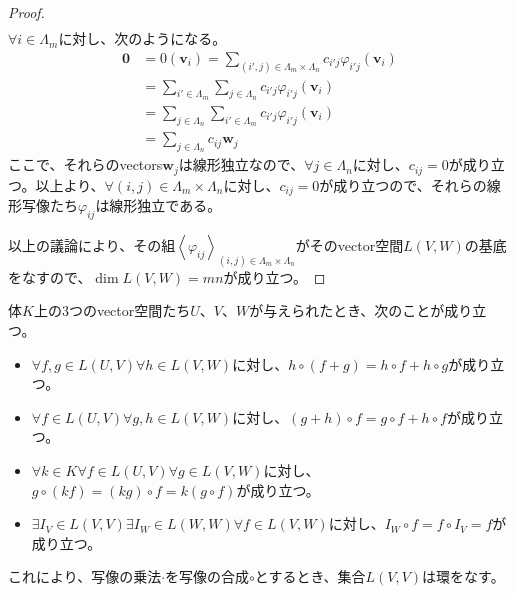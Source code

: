 \documentclass[dvipdfmx]{jsarticle}
\begin{document}
\begin{proof}
\begin{align*}
\end{align*}
$\forall i \in \varLambda_{m}$に対し、次のようになる。
\begin{align*}
\mathbf{0} &= 0\left( \mathbf{v}_{i} \right) = \sum_{\left( i',j \right) \in \varLambda_{m} \times \varLambda_{n}} {c_{i'j}\varphi_{i'j}}\left( \mathbf{v}_{i} \right)\\
&= \sum_{i' \in \varLambda_{m}} {\sum_{j \in \varLambda_{n}} {c_{i'j}\varphi_{i'j}\left( \mathbf{v}_{i} \right)}}\\
&= \sum_{j \in \varLambda_{n}} {\sum_{i' \in \varLambda_{m}} {c_{i'j}\varphi_{i'j}\left( \mathbf{v}_{i} \right)}}\\
&= \sum_{j \in \varLambda_{n}} {c_{ij}\mathbf{w}_{j}}
\end{align*}
ここで、それらのvectors$\mathbf{w}_{j}$は線形独立なので、$\forall j \in \varLambda_{n}$に対し、$c_{ij} = 0$が成り立つ。以上より、$\forall(i,j) \in \varLambda_{m} \times \varLambda_{n}$に対し、$c_{ij} = 0$が成り立つので、それらの線形写像たち$\varphi_{ij}$は線形独立である。\par
以上の議論により、その組$\left\langle \varphi_{ij} \right\rangle_{(i,j) \in \varLambda_{m} \times \varLambda_{n}}$がそのvector空間$L(V,W)$の基底をなすので、$\dim{L(V,W)} = mn$が成り立つ。
\end{proof}
\begin{thm}\label{2.1.2.10}
体$K$上の3つのvector空間たち$U$、$V$、$W$が与えられたとき、次のことが成り立つ。
\begin{itemize}
\item
  $\forall f,g \in L(U,V)\forall h \in L(V,W)$に対し、$h \circ (f + g) = h \circ f + h \circ g$が成り立つ。
\item
  $\forall f \in L(U,V)\forall g,h \in L(V,W)$に対し、$(g + h) \circ f = g \circ f + h \circ f$が成り立つ。
\item
  $\forall k \in K\forall f \in L(U,V)\forall g \in L(V,W)$に対し、$g \circ (kf) = (kg) \circ f = k(g \circ f)$が成り立つ。
\item
  $\exists I_{V} \in L(V,V)\exists I_{W} \in L(W,W)\forall f \in L(V,W)$に対し、$I_{W} \circ f = f \circ I_{V} = f$が成り立つ。
\end{itemize}
これにより、写像の乗法$\cdot$を写像の合成$\circ$とするとき、集合$L(V,V)$は環をなす。
\end{thm}
\end{document}
